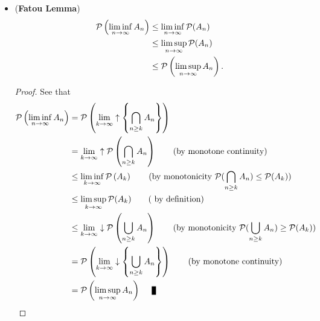 \documentclass[11pt]{article}
\begin{document}
\begin{itemize}
\begin{proof}
\begin{itemize}
For the second part, it is similar. \qed
\end{itemize}
\end{proof}

\item \begin{proposition} (\textbf{Fatou Lemma})  \citep{resnick2013probability, billingsley2008probability}
 \begin{align*}
 {\mathcal P}\left(\liminf\limits_{n\rightarrow \infty}A_{n}\right) &\le \liminf\limits_{n\rightarrow \infty}{\mathcal P}(A_{n})\\
 &\le \limsup\limits_{n\rightarrow \infty}{\mathcal P}(A_{n})\\
 &\le {\mathcal P}\left(\limsup\limits_{n\rightarrow \infty}A_{n}\right). 
 \end{align*}
\end{proposition}
\begin{proof}
See that
\begin{align*}
\cP\paren{\liminf\limits_{n\rightarrow \infty}A_{n}} &=\cP\paren{\lim\limits_{k\rightarrow \infty}\uparrow \set{\bigcap_{n\ge k}A_{n}} } \\
&= \lim\limits_{k\rightarrow \infty}\uparrow \cP\paren{ \bigcap_{n\ge k}A_{n} }  \qquad\text{(by monotone continuity)}\\
&\le \liminf\limits_{k\rightarrow \infty}\cP\paren{ A_{k} }  \qquad\text{(by monotonicity } \cP(\bigcap_{n\ge k}A_{n})\le \cP(A_{k}) )\\
&\le \limsup\limits_{k\rightarrow \infty}\cP(A_{k})\qquad  \text{( by definition)}\\
&\le \lim\limits_{k\rightarrow \infty}\downarrow \cP\paren{ \bigcup_{n\ge k}A_{n} }  \qquad\text{(by monotonicity } \cP(\bigcup_{n\ge k}A_{n})\ge \cP(A_{k}) )\\
&= \cP\paren{\lim\limits_{k\rightarrow \infty}\downarrow \set{\bigcup_{n\ge k}A_{n}} } \qquad\text{(by monotone continuity)}\\
&= \cP\paren{\limsup\limits_{n\rightarrow \infty}A_{n}} \qed
\end{align*}
\end{proof}


\end{itemize}
\end{document}
